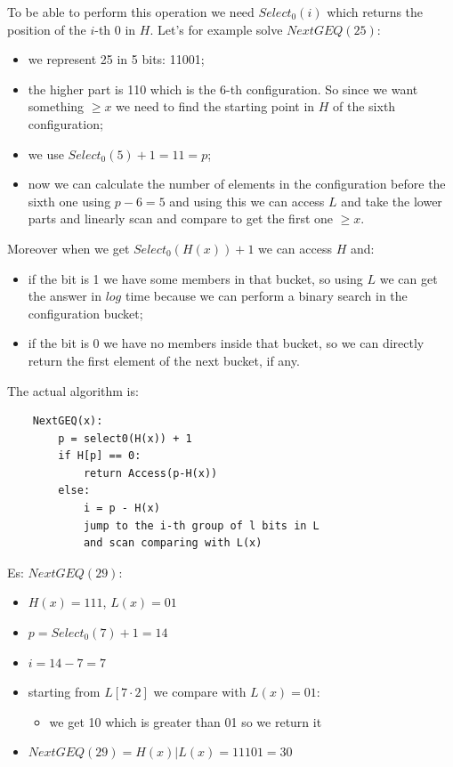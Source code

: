 To be able to perform this operation we need $Select_0(i)$ which returns the position of the $i$-th 0 in $H$.
Let's for example solve $NextGEQ(25)$:
\begin{itemize}
    \item we represent 25 in 5 bits: 11001;
    \item the higher part is 110 which is the 6-th configuration. So since we want something $\geq x$ we need to find the starting point in $H$ of the sixth configuration;
    \item we use $Select_0(5) + 1 = 11 = p$;
    \item now we can calculate the number of elements in the configuration before the sixth one using $p - 6 = 5$ and using this we can access $L$ and take the lower parts and linearly scan and compare to get the first one $\geq x$.
\end{itemize}
Moreover when we get $Select_0(H(x)) + 1$ we can access $H$ and:
\begin{itemize}
    \item if the bit is 1 we have some members in that bucket, so using $L$ we can get the answer in $log$ time because we can perform a binary search in the configuration bucket;
    \item if the bit is 0 we have no members inside that bucket, so we can directly return the first element of the next bucket, if any.
\end{itemize}

The actual algorithm is:
\begin{verbatim}
    NextGEQ(x):
        p = select0(H(x)) + 1
        if H[p] == 0:
            return Access(p-H(x))
        else:
            i = p - H(x)
            jump to the i-th group of l bits in L
            and scan comparing with L(x)
\end{verbatim}

Es: $NextGEQ(29)$:
\begin{itemize}
    \item $H(x) = 111$, $L(x) = 01$
    \item $p = Select_0(7) + 1 = 14$
    \item $i = 14 - 7 = 7$
    \item starting from $L[7 \cdot 2]$ we compare with $L(x) = 01$:
    \begin{itemize}
        \item we get 10 which is greater than 01 so we return it
    \end{itemize}
    \item $NextGEQ(29) = H(x) | L(x) = 11101 = 30$
\end{itemize}


